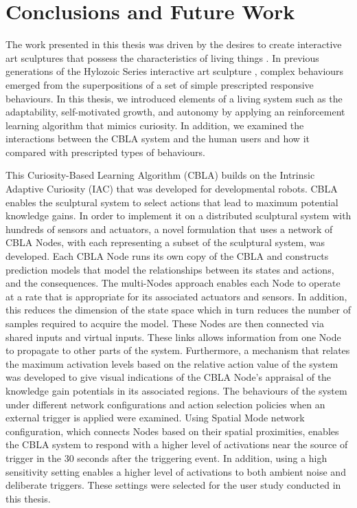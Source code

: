 \chapter{Conclusions and Future Work} \label{chap:conclusions}
 
The work presented in this thesis was driven by the desires to create interactive art sculptures that possess the characteristics of living things \cite{Gorbet2015}. In previous generations of the Hylozoic Series interactive art sculpture \cite{Beesley2012}, complex behaviours emerged from the superpositions of a set of simple prescripted responsive behaviours. In this thesis, we introduced elements of a living system such as the adaptability, self-motivated growth, and autonomy by applying an reinforcement learning algorithm that mimics curiosity. In addition, we examined the interactions between the CBLA system and the human users and how it compared with prescripted types of behaviours.
 
This Curiosity-Based Learning Algorithm (CBLA) builds on the Intrinsic Adaptive Curiosity (IAC) \cite{Oudeyer2007} that was developed for developmental robots. CBLA enables the sculptural system to select actions that lead to maximum potential knowledge gains. In order to implement it on a distributed sculptural system with hundreds of sensors and actuators, a novel formulation that uses a network of CBLA Nodes, with each representing a subset of the sculptural system, was developed. Each CBLA Node runs its own copy of the CBLA and constructs prediction models that model the relationships between its states and actions, and the consequences. The multi-Nodes approach enables each Node to operate at a rate that is appropriate for its associated actuators and sensors. In addition, this reduces the dimension of the state space which in turn reduces the number of samples required to acquire the model. These Nodes are then connected via shared inputs and virtual inputs. These links allows information from one Node to propagate to other parts of the system. Furthermore, a mechanism that relates the maximum activation levels based on the relative action value of the system was developed to give visual indications of the CBLA Node's appraisal of the knowledge gain potentials in its associated regions. The behaviours of the system under different network configurations and action selection policies when an external trigger is applied were examined. Using Spatial Mode network configuration, which connects Nodes based on their spatial proximities, enables the CBLA system to respond with a higher level of activations near the source of trigger in the 30 seconds after the triggering event. In addition, using a high sensitivity setting enables a higher level of activations to both ambient noise and deliberate triggers. These settings were selected for the user study conducted in this thesis.

